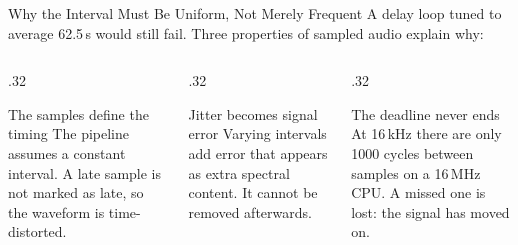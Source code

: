 \documentclass[9pt,aspectratio=169,xcolor=table]{beamer}
\begin{document}
\begin{frame}{Why the Interval Must Be Uniform, Not Merely Frequent}
    \leavevmode
    {\small A delay loop tuned to average 62.5\,\textmu s would still fail. Three properties of sampled audio explain why:}

    \vspace{2mm}
    \begin{columns}[T]
    \begin{column}{.32\textwidth}
        \begin{block}{The samples define the timing}
            {\small The pipeline assumes a constant interval. A late sample is not marked as late, so the waveform is \alert{time-distorted}.}
        \end{block}
    \end{column}
    \begin{column}{.32\textwidth}
        \begin{block}{Jitter becomes signal error}
            {\small Varying intervals add error that appears as extra spectral content. It \alert{cannot be removed afterwards}.}
        \end{block}
    \end{column}
    \begin{column}{.32\textwidth}
        \begin{block}{The deadline never ends}
            {\small At 16\,kHz there are only \alert{1000 cycles} between samples on a 16\,MHz CPU. A missed one is lost: the signal has moved on.}
        \end{block}
    \end{column}
    \end{columns}
\end{frame}
\end{document}
